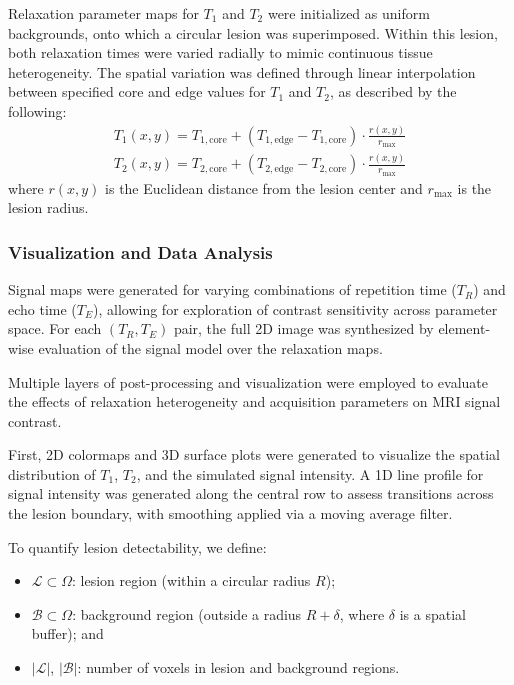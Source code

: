 \documentclass[10pt,a4paper,twoside]{article}
\begin{document}
Relaxation parameter maps for \( T_1 \) and \( T_2 \) were initialized as uniform backgrounds, onto which a circular lesion was superimposed. Within this lesion, both relaxation times were varied radially to mimic continuous tissue heterogeneity. The spatial variation was defined through linear interpolation between specified core and edge values for \( T_1 \) and \( T_2 \), as described by the following:
\begin{align}
    T_1(x, y) = T_{1,\text{core}} + \left( T_{1,\text{edge}} - T_{1,\text{core}} \right) \cdot \frac{r(x, y)}{r_{\max}} \label{eq:relax1} \\
    T_2(x, y) = T_{2,\text{core}} + \left( T_{2,\text{edge}} - T_{2,\text{core}} \right) \cdot \frac{r(x, y)}{r_{\max}} \label{eq:relax2}
\end{align}
where \( r(x, y) \) is the Euclidean distance from the lesion center and \( r_{\max} \) is the lesion radius.

\subsubsection{Visualization and Data Analysis}

Signal maps were generated for varying combinations of repetition time (\( T_R \)) and echo time (\( T_E \)), allowing for exploration of contrast sensitivity across parameter space. For each \( (T_R, T_E) \) pair, the full 2D image was synthesized by element-wise evaluation of the signal model over the relaxation maps.

Multiple layers of post-processing and visualization were employed to evaluate the effects of relaxation heterogeneity and acquisition parameters on MRI signal contrast.

First, 2D colormaps and 3D surface plots were generated to visualize the spatial distribution of \( T_1 \), \( T_2 \), and the simulated signal intensity. A 1D line profile for signal intensity was generated along the central row to assess transitions across the lesion boundary, with smoothing applied via a moving average filter.

To quantify lesion detectability, we define:
\begin{itemize}
    \item \( \mathcal{L} \subset \Omega \): lesion region (within a circular radius \( R \));
    \item \( \mathcal{B} \subset \Omega \): background region (outside a radius \( R + \delta \), where \( \delta \) is a spatial buffer); and
    \item \( |\mathcal{L}| \), \( |\mathcal{B}| \): number of voxels in lesion and background regions.
\end{itemize}
\end{document}
